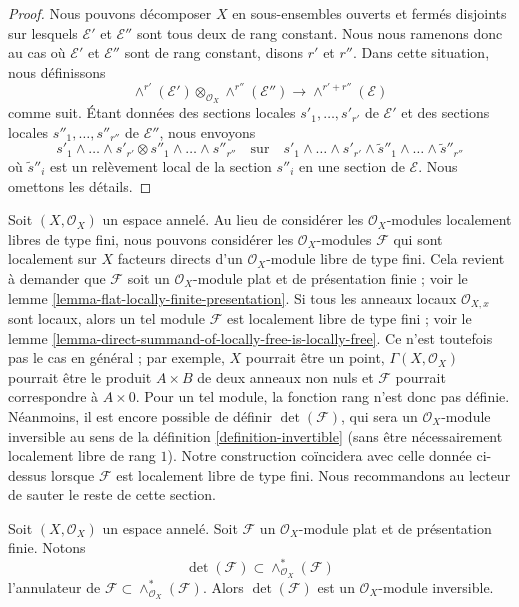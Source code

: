 \begin{proof}
Nous pouvons décomposer $X$ en sous-ensembles ouverts et fermés disjoints sur lesquels
$\mathcal{E}'$ et $\mathcal{E}''$ sont tous deux de rang constant.
Nous nous ramenons donc au cas où $\mathcal{E}'$ et $\mathcal{E}''$
sont de rang constant, disons $r'$ et $r''$. Dans cette situation, nous
définissons
$$
\wedge^{r'}(\mathcal{E}') \otimes_{\mathcal{O}_X} \wedge^{r''}(\mathcal{E}'')
\longrightarrow
\wedge^{r' + r''}(\mathcal{E})
$$
comme suit. Étant données des sections locales $s'_1, \ldots, s'_{r'}$ de $\mathcal{E}'$
et des sections locales $s''_1, \ldots, s''_{r''}$ de $\mathcal{E}''$,
nous envoyons
$$
s'_1 \wedge \ldots \wedge s'_{r'} \otimes
s''_1 \wedge \ldots \wedge s''_{r''}
\quad\text{sur}\quad
s'_1 \wedge \ldots \wedge s'_{r'} \wedge
\tilde s''_1 \wedge \ldots \wedge \tilde s''_{r''}
$$
où $\tilde s''_i$ est un relèvement local de la section
$s''_i$ en une section de $\mathcal{E}$. Nous omettons les détails.
\end{proof}

\noindent
Soit $(X, \mathcal{O}_X)$ un espace annelé. Au lieu de considérer les
$\mathcal{O}_X$-modules localement libres de type fini, nous pouvons considérer les
$\mathcal{O}_X$-modules $\mathcal{F}$ qui sont localement sur $X$
facteurs directs d'un $\mathcal{O}_X$-module libre de type fini. Cela revient à
demander que $\mathcal{F}$ soit un $\mathcal{O}_X$-module plat et de
présentation finie ; voir le lemme \ref{lemma-flat-locally-finite-presentation}.
Si tous les anneaux locaux $\mathcal{O}_{X, x}$ sont locaux, alors un tel module
$\mathcal{F}$ est localement libre de type fini ; voir le
lemme \ref{lemma-direct-summand-of-locally-free-is-locally-free}.
Ce n'est toutefois pas le cas en général ; par
exemple, $X$ pourrait être un point, $\Gamma(X, \mathcal{O}_X)$ pourrait
être le produit $A \times B$ de deux anneaux non nuls et $\mathcal{F}$
pourrait correspondre à $A \times 0$.
Pour un tel module, la fonction rang n'est donc pas définie.
Néanmoins, il est encore possible de définir $\det(\mathcal{F})$,
qui sera un $\mathcal{O}_X$-module inversible au sens de la
définition \ref{definition-invertible} (sans être nécessairement localement
libre de rang $1$). Notre construction coïncidera avec celle donnée ci-dessus
lorsque $\mathcal{F}$ est localement libre de type fini.
Nous recommandons au lecteur de sauter le reste de cette section.

\begin{lemma}
\label{lemma-determinant-as-socle}
Soit $(X, \mathcal{O}_X)$ un espace annelé. Soit $\mathcal{F}$
un $\mathcal{O}_X$-module plat et de présentation finie.
Notons
$$
\det(\mathcal{F}) \subset
\wedge^*_{\mathcal{O}_X}(\mathcal{F})
$$
l'annulateur de $\mathcal{F} \subset \wedge^*_{\mathcal{O}_X}(\mathcal{F})$.
Alors $\det(\mathcal{F})$ est un $\mathcal{O}_X$-module inversible.
\end{lemma}

